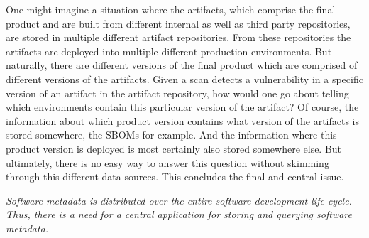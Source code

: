 One might imagine a situation where the artifacts, which comprise the final product and are built from different internal as well as third party repositories, are stored in multiple different artifact repositories. From these repositories the artifacts are deployed into multiple different production environments. But naturally, there are different versions of the final product which are comprised of different versions of the artifacts. Given a scan detects a vulnerability in a specific version of an artifact in the artifact repository, how would one go about telling which environments contain this particular version of the artifact? Of course, the information about which product version contains what version of the artifacts is stored somewhere, the SBOMs for example. And the information where this product version is deployed is most certainly also stored somewhere else. But ultimately, there is no easy way to answer this question without skimming through this different data sources. This concludes the final and central issue.\par
\emph{Software metadata is distributed over the entire software development life cycle. Thus, there is a need for a central application for storing and querying software metadata.}


%







